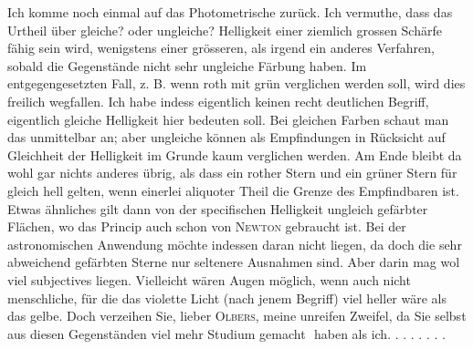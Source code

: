 Ich komme noch einmal auf das Photometrische zurück. Ich vermuthe, dass das Urtheil über gleiche? oder ungleiche? Helligkeit einer ziemlich grossen Schärfe fähig sein wird, wenigstens einer grösseren, als irgend ein anderes Verfahren, sobald die Gegenstände nicht sehr ungleiche Färbung haben. Im entgegengesetzten Fall, z. B. wenn roth mit grün verglichen werden soll, wird dies freilich wegfallen. Ich habe indess eigentlich keinen recht deutlichen Begriff,  eigentlich gleiche Helligkeit hier bedeuten soll. Bei gleichen Farben schaut man das unmittelbar an; aber ungleiche können als Empfindungen in Rücksicht auf Gleichheit der Helligkeit im Grunde kaum verglichen werden. Am Ende bleibt da wohl gar nichts anderes übrig, als dass ein rother Stern und ein grüner Stern für gleich hell gelten, wenn einerlei aliquoter Theil die Grenze des Empfindbaren ist. Etwas ähnliches gilt dann von der specifischen Helligkeit ungleich gefärbter Flächen, wo das Princip auch schon von \textsc{Newton} gebraucht ist. Bei der astronomischen Anwendung möchte indessen daran nicht  liegen, da doch die sehr abweichend gefärbten Sterne nur seltenere Ausnahmen sind. Aber darin mag wol viel subjectives liegen. Vielleicht wären Augen möglich, wenn auch nicht menschliche, für die das violette Licht (nach jenem Begriff) viel heller wäre als das gelbe. Doch verzeihen Sie, lieber \textsc{Olbers}, meine unreifen Zweifel, da Sie selbst aus diesen Gegenständen viel mehr Studium gemacht\,\ haben als ich. . . . . . . .
\clearpage\endgroup
